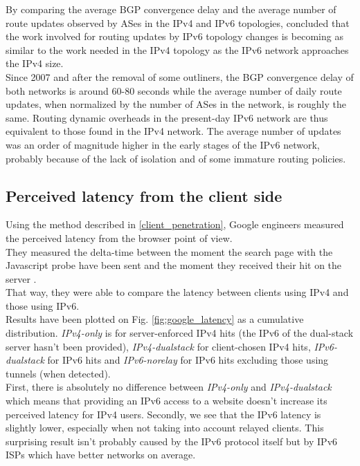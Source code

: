 \documentclass[journal]{IEEEtran}
\begin{document}
By comparing the average BGP convergence delay and the average number of route
updates observed by ASes in the IPv4 and IPv6 topologies, \cite{paper4}
concluded that the work involved for routing updates by IPv6 topology changes is
becoming as similar to the work needed in the IPv4 topology as the IPv6 network
approaches the IPv4 size. \\
Since 2007 and after the removal of some outliners, the BGP convergence delay of
both networks is around 60-80 seconds while the average number of daily route
updates, when normalized by the number of ASes in the network, is roughly the
same. Routing dynamic overheads in the present-day IPv6 network are thus
equivalent to those found in the IPv4 network. The average number of updates was
an order of magnitude higher in the early stages of the IPv6 network, probably
because of the lack of isolation and of some immature routing policies.

\subsection{Perceived latency from the client side}

Using the method described in \ref{client_penetration}, Google engineers measured
the perceived latency from the browser point of view. \\
They measured the delta-time between the moment the search page with the
Javascript probe have been sent and the moment they received their hit on the
server . \\
That way, they were able to compare the latency between clients using IPv4 and
those using IPv6. \\
Results have been plotted on Fig. \ref{fig:google_latency} as a cumulative
distribution. \textit{IPv4-only} is for server-enforced IPv4 hits (the IPv6 of
the dual-stack server hasn't been provided), \textit{IPv4-dualstack} for
client-chosen IPv4 hits, \textit{IPv6-dualstack} for IPv6 hits and
\textit{IPv6-norelay} for IPv6 hits excluding those using tunnels (when
detected). \\
First, there is absolutely no difference between \textit{IPv4-only} and
\textit{IPv4-dualstack} which means that providing an IPv6 access to a website
doesn't increase its perceived latency for IPv4 users.
Secondly, we see that the IPv6 latency is slightly lower, especially
when not taking into account relayed clients. This surprising result isn't
probably caused by the IPv6 protocol itself but by IPv6 ISPs which have better
networks on average.
\end{document}
